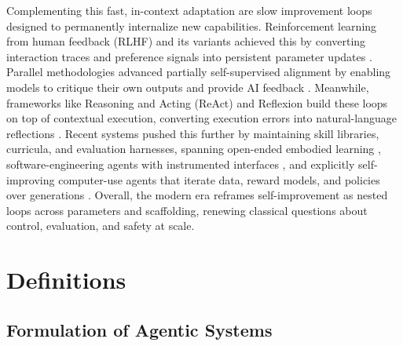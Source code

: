 \documentclass{article}
\begin{document}
Complementing this fast, in-context adaptation are slow improvement loops designed to permanently internalize new capabilities. Reinforcement learning from human feedback (RLHF) and its variants achieved this by converting interaction traces and preference signals into persistent parameter updates \citep{ouyang2022training}. Parallel methodologies advanced partially self-supervised alignment by enabling models to critique their own outputs and provide AI feedback \citep{bai2022constitutional}. Meanwhile, frameworks like Reasoning and Acting (ReAct) and Reflexion build these loops on top of contextual execution, converting execution errors into natural-language reflections \citep{yao2022react, shinn2023reflexionlanguageagentsverbal}. Recent systems  pushed this further by maintaining skill libraries, curricula, and evaluation harnesses, spanning open-ended embodied learning \citep{wang2023voyageropenendedembodiedagent}, software-engineering agents with instrumented interfaces \citep{yang2024sweagentagentcomputerinterfacesenable, zhang2025darwingodelmachineopenended, wang2025huxleygodelmachinehumanlevelcoding}, and explicitly self-improving computer-use agents that iterate data, reward models, and policies over generations \citep{xiao2025uigenie, sun2025seagentselfevolvingcomputeruse}. Overall, the modern era reframes self-improvement as nested loops across parameters and scaffolding, renewing classical questions about control, evaluation, and safety at scale.


\section{Definitions}
\label{sec:Definitions}

\subsection{Formulation of Agentic Systems}
\label{subsec:Foundation_Model_Based_Agents}
\end{document}
